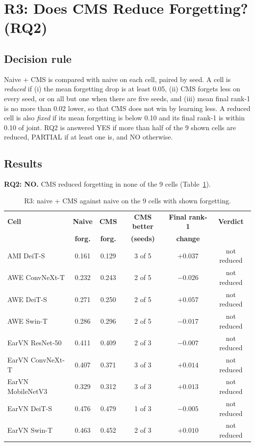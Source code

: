 \documentclass[12pt,a4paper]{report}
\begin{document}
\section{R3: Does CMS Reduce Forgetting? (RQ2)}
\subsection{Decision rule}
Naive + CMS is compared with naive on each cell, paired by seed. A cell is \emph{reduced} if (i) the mean forgetting drop is at least 0.05, (ii) CMS forgets less on every seed, or on all but one when there are five seeds, and (iii) mean final rank-1 is no more than 0.02 lower, so that CMS does not win by learning less. A reduced cell is also \emph{fixed} if its mean forgetting is below 0.10 and its final rank-1 is within 0.10 of joint. RQ2 is answered YES if more than half of the 9 shown cells are reduced, PARTIAL if at least one is, and NO otherwise.

\subsection{Results}
\textbf{RQ2: NO.} CMS reduced forgetting in none of the 9 cells (Table~\ref{tab:r3}).

\begin{table}[H]
\centering
\small
\caption{R3: naive + CMS against naive on the 9 cells with shown forgetting.}
\label{tab:r3}
\begin{tabular}{|l|c|c|c|c|c|}
\hline
\textbf{Cell} & \textbf{Naive} & \textbf{CMS} & \textbf{CMS better} & \textbf{Final rank-1} & \textbf{Verdict} \\
 & \textbf{forg.} & \textbf{forg.} & \textbf{(seeds)} & \textbf{change} & \\
\hline
AMI DeiT-S & 0.161 & 0.129 & 3 of 5 & $+0.037$ & not reduced \\
AWE ConvNeXt-T & 0.232 & 0.243 & 2 of 5 & $-0.026$ & not reduced \\
AWE DeiT-S & 0.271 & 0.250 & 2 of 5 & $+0.057$ & not reduced \\
AWE Swin-T & 0.286 & 0.296 & 2 of 5 & $-0.017$ & not reduced \\
EarVN ResNet-50 & 0.411 & 0.409 & 2 of 3 & $-0.007$ & not reduced \\
EarVN ConvNeXt-T & 0.407 & 0.371 & 3 of 3 & $+0.014$ & not reduced \\
EarVN MobileNetV3 & 0.329 & 0.312 & 3 of 3 & $+0.013$ & not reduced \\
EarVN DeiT-S & 0.476 & 0.479 & 1 of 3 & $-0.005$ & not reduced \\
EarVN Swin-T & 0.463 & 0.452 & 2 of 3 & $+0.010$ & not reduced \\
\hline
\end{tabular}
\end{table}
\end{document}
